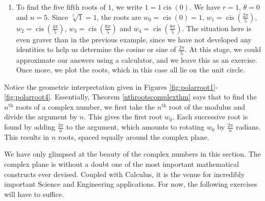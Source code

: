 {\begin{enumerate}

\item  To find the five fifth roots of $1$, we write $1 = 1 \operatorname{cis}(0)$.  We have $r = 1$, $\theta = 0$ and $n = 5$. Since $\sqrt[5]{1} = 1$, the roots are  $w_{0} = \operatorname{cis}(0) = 1$, $w_{1} = \operatorname{cis}\left(\frac{2\pi}{5}\right)$, $w_{2} = \operatorname{cis}\left(\frac{4\pi}{5}\right)$, $w_{3} = \operatorname{cis}\left(\frac{6\pi}{5}\right)$ and $w_{4} = \operatorname{cis}\left(\frac{8\pi}{5}\right)$.  The situation here is even graver than in the previous example, since we have not developed any identities to help us determine the cosine or sine of $\frac{2\pi}{5}$.  At this stage, we could approximate our answers using a calculator, and we leave this as an exercise. Once more, we plot the roots, which in this case all lie on the unit circle.


\end{enumerate}
}

\medskip

Notice the geometric interpretation given in Figures \ref{fig:polarroot1}-\ref{fig:polarroot4}.  Essentially,  Theorem \ref{nthrootscomplexthm} says that to find the $n^{\text{th}}$ roots of a complex number,  we first take the $n^{\text{th}}$ root of the modulus and divide the argument by $n$.  This gives the first root  $w_{0}$. Each successive root is found by adding  $\frac{2\pi}{n}$ to the argument, which amounts to rotating $w_{0}$ by $\frac{2\pi}{n}$ radians.  This results in $n$ roots, spaced equally around the complex plane.  

We have only glimpsed at the beauty of the complex numbers in this section.  The complex plane is without a doubt one of the most important mathematical constructs ever devised.  Coupled with Calculus, it is the venue for incredibly important Science and Engineering applications.  For now, the following exercises will have to suffice.

